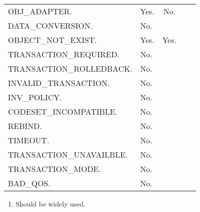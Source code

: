 \documentclass[a4paper,10pt]{article}
\begin{document}
\begin{center}
\begin {tabular}{|l|l|c|c|c|}
OBJ\_ADAPTER.              & Yes. & No.    \\
DATA\_CONVERSION.          & No.  &        \\
OBJECT\_NOT\_EXIST.        & Yes. & Yes.   \\
TRANSACTION\_REQUIRED.     & No.  &        \\
TRANSACTION\_ROLLEDBACK.   & No.  &        \\
INVALID\_TRANSACTION.      & No.  &        \\
INV\_POLICY.               & No.  &        \\
CODESET\_INCOMPATIBLE.     & No.  &        \\
REBIND.                    & No.  &        \\
TIMEOUT.                   & No.  &        \\
TRANSACTION\_UNAVAILBLE.   & No.  &        \\
TRANSACTION\_MODE.         & No.  &        \\
BAD\_QOS.                  & No.  &        \\
\hline
\end{tabular}
\end{center}
\begin{enumerate}
\item Should be widely used.
\end{enumerate}
\end{document}
